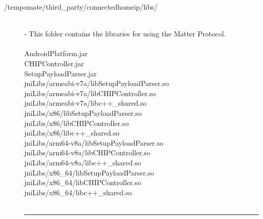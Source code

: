 \begin{enumerate}[label=\alph*]
\begin{description}
              \item[/tempomate/third\_party/connectedhomeip/libs/] \hfill \\
                    \small
                    - This folder contains the libraries for using the Matter Protocol.\\\\
                    \footnotesize
                    AndroidPlatform.jar  \\
                    CHIPController.jar  \\
                    SetupPayloadParser.jar  \\
                    jniLibs/armeabi-v7a/libSetupPayloadParser.so  \\
                    jniLibs/armeabi-v7a/libCHIPController.so  \\
                    jniLibs/armeabi-v7a/libc++\_shared.so  \\
                    jniLibs/x86/libSetupPayloadParser.so  \\
                    jniLibs/x86/libCHIPController.so  \\
                    jniLibs/x86/libc++\_shared.so  \\
                    jniLibs/arm64-v8a/libSetupPayloadParser.so  \\
                    jniLibs/arm64-v8a/libCHIPController.so  \\
                    jniLibs/arm64-v8a/libc++\_shared.so  \\
                    jniLibs/x86\_64/libSetupPayloadParser.so  \\
                    jniLibs/x86\_64/libCHIPController.so  \\
                    jniLibs/x86\_64/libc++\_shared.so  \\\\

                    \vspace{-0.2cm}
                    \hrule
                    \vspace{0.2cm}


\end{description}
\end{enumerate}
